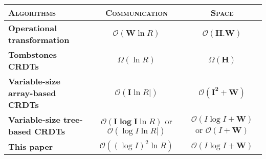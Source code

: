 

\begin{tabular}{@{}lcc@{}}
  \toprule
  \textsc{Algorithms} & \textsc{Communication} & \textsc{Space} \\ \midrule 
  \textbf{Operational transformation~\cite{suleiman1997serialization, sun2009contextbased}} & $\mathcal{O}(\pmb{W}\ln R)$ & $\mathcal{O}(\pmb{H.W})$ \\ \midrule
  \textbf{Tombstones CRDTs~\cite{ahmed2011evaluating, conway2014language, oster2006data, roh2011replicated, weiss2007wooki, wu2010partial, yu2012stringwise}} & $\Omega (\ln R)$ & $\Omega (\pmb{H})$ \\ \midrule
  \textbf{Variable-size array-based CRDTs~\cite{weiss2009logoot}} & $\mathcal{O}(\pmb{I}\ln R|)$ & $\mathcal{O}(\pmb{I^2+W})$ \\ \midrule
  \textbf{Variable-size tree-based CRDTs~\cite{preguica2009commutative}} & $\mathcal{O}(\pmb{I\log I} \ln R)$ or $\mathcal{O}(\log I\ln R|)$ & $\mathcal{O}(I\log I + \pmb{W})$ or $\mathcal{O}(I + \pmb{W})$ \\ \midrule
  \textbf{This paper~\cite{nedelec2013lseq}} & $\mathcal{O}((\log I)^2\ln R)$ & $\mathcal{O}(I\log I + \pmb{W})$ \\ \bottomrule
\end{tabular}

